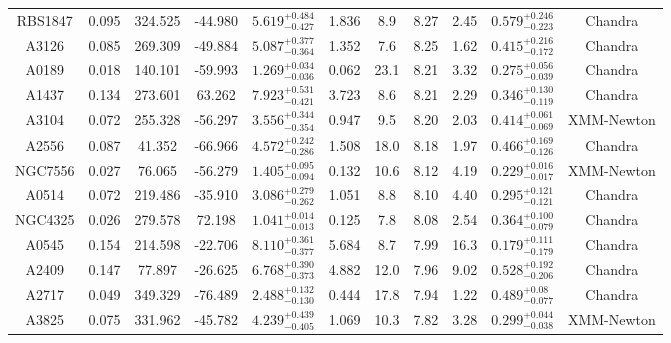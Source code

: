 \documentclass{aa}   %
\begin{document}
\begin{table}[h!]
\begin{center}
\begin{tabular}{ c  c  c  c c c c c c c c }
RBS1847             		&		0.095	&	324.525	&	-44.980	& $	5.619^{+0.484}_{-0.427}$  &      1.836	&  8.9	&	8.27	&	2.45	&	$ 0.579^{+0.246}_{-0.223}  $ &	  Chandra     \\
A3126               		&		0.085	&	269.309	&	-49.884	& $	5.087^{+0.377}_{-0.364}$  &      1.352	&  7.6	&	8.25	&	1.62	&	$ 0.415^{+0.216}_{-0.172}  $ &	 Chandra      \\
A0189               		&		0.018	&	140.101	&	-59.993	& $	1.269^{+0.034}_{-0.036}$  &      0.062	&  23.1	&	8.21	&	3.32	&	$ 0.275^{+0.056}_{-0.039}  $ &	  Chandra     \\
A1437               		&		0.134	&	273.601	&	63.262	& $	7.923^{+0.531}_{-0.421}$  &      3.723	&  8.6	&	8.21	&	2.29	&	$ 0.346^{+0.130}_{-0.119}  $ &	  Chandra     \\
A3104               		&		0.072	&	255.328	&	-56.297	& $	3.556^{+0.344}_{-0.354}$  &      0.947	&  9.5	&	8.20	&	2.03	&	$ 0.414^{+0.061}_{-0.069}  $ &	 XMM-Newton   \\
A2556               		&		0.087	&	41.352	&	-66.966	& $	4.572^{+0.242}_{-0.286}$  &      1.508	&  18.0	&	8.18	&	1.97	&	$ 0.466^{+0.169}_{-0.126}  $ &	  Chandra     \\
NGC7556             		&		0.027	&	76.065	&	-56.279	& $	1.405^{+0.095}_{-0.094}$  &      0.132	&  10.6	&	8.12	&	4.19	&	$ 0.229^{+0.016}_{-0.017}  $ &	  XMM-Newton  \\
A0514               		&		0.072	&	219.486	&	-35.910	& $	3.086^{+0.279}_{-0.262}$  &      1.051	&  8.8	&	8.10	&	4.40	&	$ 0.295^{+0.121}_{-0.121}  $ &	 Chandra      \\
NGC4325             		&		0.026	&	279.578	&	72.198	& $	1.041^{+0.014}_{-0.013}$  &      0.125	&  7.8	&	8.08	&	2.54	&	$ 0.364^{+0.100}_{-0.079}  $ &	  Chandra     \\
A0545               		&		0.154	&	214.598	&	-22.706	& $	8.110^{+0.361}_{-0.377}$  &      5.684	&  8.7	&	7.99	&	16.3	&	$ 0.179^{+0.111}_{-0.179}  $ &	 Chandra      \\
A2409               		&		0.147	&	77.897	&	-26.625	& $	6.768^{+0.390}_{-0.373}$  &      4.882	&  12.0	&	7.96	&	9.02	&	$ 0.528^{+0.192}_{-0.206}  $ &	 Chandra      \\
A2717               		&		0.049	&	349.329	&	-76.489	& $	2.488^{+0.132}_{-0.130}$  &      0.444	&  17.8	&	7.94	&	1.22	&	$ 0.489^{+0.08}_{-0.077}   $ &  Chandra       \\
A3825               		&		0.075	&	331.962	&	-45.782	& $	4.239^{+0.439}_{-0.405}$  &      1.069	&  10.3	&	7.82	&	3.28	&	$ 0.299^{+0.044}_{-0.038}  $ &	  XMM-Newton  \\

\end{tabular}
\end{center}
\end{table}
\end{document}
